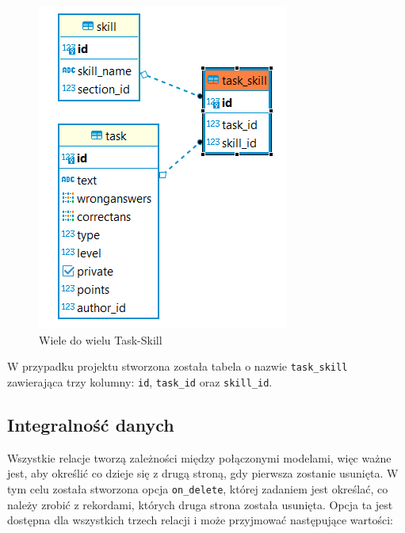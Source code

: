 \documentclass[oneside,polski,logo,indent]{amuthesis}
\begin{document}
\begin{figure}[H]
  \centering
  \includegraphics[scale=0.8]{task_skill.png}
  \caption{Wiele do wielu Task-Skill}
  \label{obraz-przyklad}
\end{figure}

W przypadku projektu stworzona została tabela o nazwie \texttt{task\_skill} zawierająca trzy kolumny: \texttt{id}, \texttt{task\_id} oraz \texttt{skill\_id}.

\begin{center}
\subsection{Integralność danych}
\end{center}
Wszystkie relacje tworzą zależności między połączonymi modelami, więc ważne jest, aby określić co dzieje się z drugą stroną, gdy pierwsza zostanie usunięta.
W tym celu została stworzona opcja \texttt{on\_delete}, której zadaniem jest określać, co należy zrobić z rekordami, których druga strona została usunięta. Opcja ta jest dostępna dla wszystkich trzech relacji i może przyjmować następujące wartości:
\end{document}
